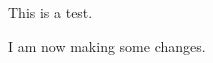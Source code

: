 \documentclass{article}
\begin{document}
    This is a test.

    I am now making some changes. 
\end{document}
